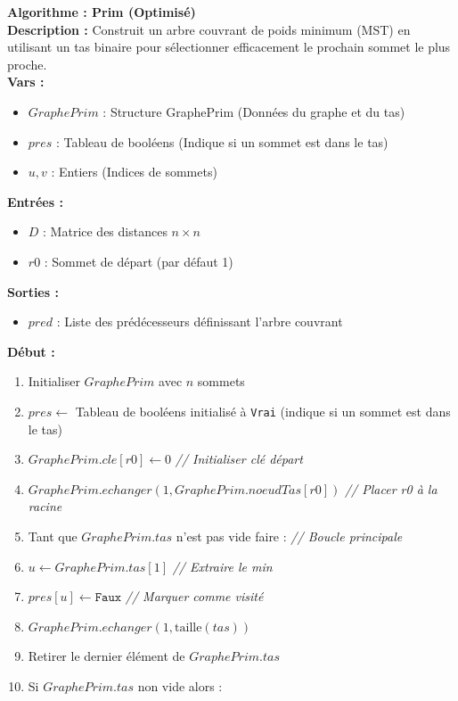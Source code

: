 \documentclass[a4paper, 12pt]{article}
\begin{document}
\begin{tcolorbox}[colback=darkWhite!75!white,colframe=black!30,left=5pt,right=5pt,top=5pt,bottom=5pt]
\textbf{Algorithme : Prim (Optimisé)} \\
\textbf{Description :} Construit un arbre couvrant de poids minimum (MST) en utilisant un tas binaire pour sélectionner efficacement le prochain sommet le plus proche. \\
\textbf{Vars :}
\begin{itemize}
    \item $GraphePrim$ : Structure GraphePrim (Données du graphe et du tas)
    \item $pres$ : Tableau de booléens (Indique si un sommet est dans le tas)
    \item $u, v$ : Entiers (Indices de sommets)
\end{itemize}
\textbf{Entrées :}
\begin{itemize}
    \item $D$ : Matrice des distances $n \times n$
    \item $r0$ : Sommet de départ (par défaut 1)
\end{itemize}
\textbf{Sorties :}
\begin{itemize}
    \item $pred$ : Liste des prédécesseurs définissant l'arbre couvrant
\end{itemize}
\textbf{Début :}
\begin{enumerate}
    \item Initialiser $GraphePrim$ avec $n$ sommets
    \item $pres \leftarrow$ Tableau de booléens initialisé à \texttt{Vrai} (indique si un sommet est dans le tas)
    \item $GraphePrim.cle[r0] \leftarrow 0$ \textit{// Initialiser clé départ}
    \item $GraphePrim.echanger(1, GraphePrim.noeudTas[r0])$ \textit{// Placer r0 à la racine}
    \item Tant que $GraphePrim.tas$ n'est pas vide faire : \textit{// Boucle principale}
    \item \quad $u \leftarrow GraphePrim.tas[1]$ \textit{// Extraire le min}
    \item \quad $pres[u] \leftarrow \texttt{Faux}$ \textit{// Marquer comme visité}
    \item \quad $GraphePrim.echanger(1, \text{taille}(tas))$
    \item \quad Retirer le dernier élément de $GraphePrim.tas$
    \item \quad Si $GraphePrim.tas$ non vide alors :

\end{enumerate}
\end{tcolorbox}
\end{document}
